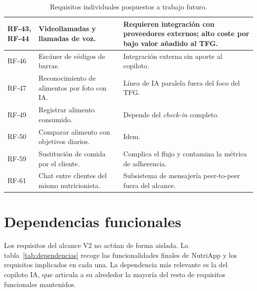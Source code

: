 \begin{table}[htbp]
\begin{tabular}{|p{1.9cm}|p{6.6cm}|p{4.6cm}|}
\hline
RF-43, RF-44 & Videollamadas y llamadas de voz. & Requieren integración con proveedores externos; alto coste por bajo valor añadido al TFG. \\
\hline
RF-46 & Escáner de códigos de barras. & Integración externa sin aporte al copiloto. \\
\hline
RF-47 & Reconocimiento de alimentos por foto con IA. & Línea de IA paralela fuera del foco del TFG. \\
\hline
RF-49 & Registrar alimento consumido. & Depende del \textit{check-in} completo. \\
\hline
RF-50 & Comparar alimento con objetivos diarios. & Idem. \\
\hline
RF-59 & Sustitución de comida por el cliente. & Complica el flujo y contamina la métrica de adherencia. \\
\hline
RF-61 & Chat entre clientes del mismo nutricionista. & Subsistema de mensajería peer-to-peer fuera del alcance. \\
\hline
\end{tabular}
\caption{Requisitos individuales pospuestos a trabajo futuro.}
\label{tab:rfIndividualesFuera}
\end{table}


\section{Dependencias funcionales}
\label{sec:dependencias}

Los requisitos del alcance V2 no actúan de forma aislada. La tabla~\ref{tab:dependencias} recoge las funcionalidades finales de NutriApp y los requisitos implicados en cada una. La dependencia más relevante es la del copiloto IA, que articula a su alrededor la mayoría del resto de requisitos funcionales mantenidos.

